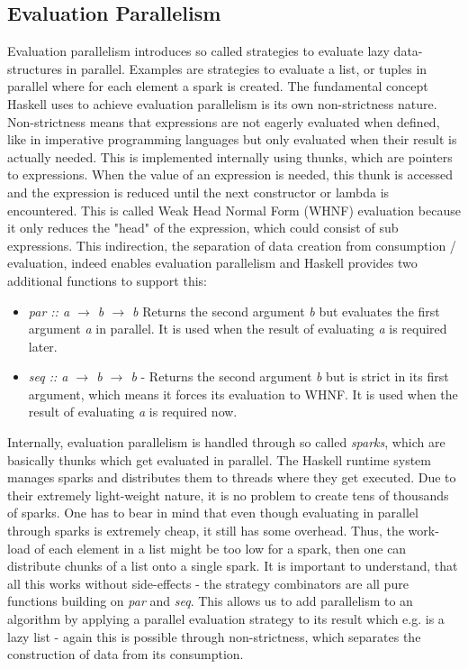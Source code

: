 \subsection{Evaluation Parallelism}
Evaluation parallelism introduces so called strategies to evaluate lazy data-structures in parallel. Examples are strategies to evaluate a list, or tuples in parallel where for each element a spark is created. The fundamental concept Haskell uses to achieve evaluation parallelism is its own non-strictness nature. Non-strictness means that expressions are not eagerly evaluated when defined, like in imperative programming languages but only evaluated when their result is actually needed. This is implemented internally using thunks, which are pointers to expressions. When the value of an expression is needed, this thunk is accessed and the expression is reduced until the next constructor or lambda is encountered. This is called Weak Head Normal Form (WHNF) evaluation because it only reduces the "head" of the expression, which could consist of sub expressions. This indirection, the separation of data creation from consumption / evaluation, indeed enables evaluation parallelism and Haskell provides two additional functions to support this:

\begin{itemize}
	\item \textit{par :: a $\rightarrow$ b $\rightarrow$ b} Returns the second argument \textit{b} but evaluates the first argument \textit{a} in parallel. It is used when the result of evaluating \textit{a} is required later.
	
	\item \textit{seq :: a $\rightarrow$ b $\rightarrow$ b} - Returns the second argument \textit{b} but is strict in its first argument, which means it forces its evaluation to WHNF. It is used when the result of evaluating \textit{a} is required now.
\end{itemize}

Internally, evaluation parallelism is handled through so called \textit{sparks}, which are basically thunks which get evaluated in parallel. The Haskell runtime system manages sparks and distributes them to threads where they get executed. Due to their extremely light-weight nature, it is no problem to create tens of thousands of sparks. One has to bear in mind that even though evaluating in parallel through sparks is extremely cheap, it still has some overhead. Thus, the work-load of each element in a list might be too low for a spark, then one can distribute chunks of a list onto a single spark.
It is important to understand, that all this works without side-effects - the strategy combinators are all pure functions building on \textit{par} and \textit{seq}. This allows us to add parallelism to an algorithm by applying a parallel evaluation strategy to its result which e.g. is a lazy list - again this is possible through non-strictness, which separates the construction of data from its consumption.

